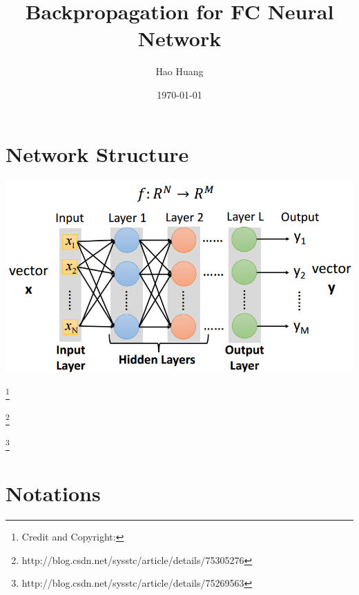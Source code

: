 \documentclass{article}
\title{Backpropagation for FC Neural Network}
\newcommand\blfootnote[1]
{%
  \begingroup
  \renewcommand\thefootnote{}\footnote{#1}%
  \addtocounter{footnote}{-1}%
  \endgroup
}
\begin{document}
\begin{titlepage}
\author{Hao Huang}
\date{\today}
\maketitle
\end{titlepage}

\tableofcontents
\newpage

\section{Network Structure}
\begin{center}
\includegraphics[scale=0.3]{neuralnetwork}
\end{center} 

\blfootnote{Credit and Copyright:}
\blfootnote{http://blog.csdn.net/sysstc/article/details/75305276}
\blfootnote{http://blog.csdn.net/sysstc/article/details/75269563}
 
\section{Notations}
\end{document}
